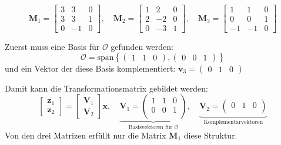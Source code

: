 \documentclass{article}
\begin{document}
\begin{task}
\begin{enumerate}[i]
\[\mathbf{M}_{1}=\left[\begin{array}{ccc}{3} & {3} & {0} \\ {3} & {3} & {1} \\ {0} & {-1} & {0}\end{array}\right], \quad \mathbf{M}_{2}=\left[\begin{array}{ccc}{1} & {2} & {0} \\ {2} & {-2} & {0} \\ {0} & {-3} & {1}\end{array}\right], \quad \mathbf{M}_{3}=\left[\begin{array}{ccc}{1} & {1} & {0} \\ {0} & {0} & {1} \\ {-1} & {-1} & {0}\end{array}\right]
 \]
 \begin{solution}
 Zuerst muss eine Basis für $\mathcal{O}$ gefunden werden:
 \[ \mathcal{O} = \text{span}\left\{ 
 \begin{pmatrix} 1 & 1 & 0 \end{pmatrix},
 \begin{pmatrix} 0 & 0 & 1 \end{pmatrix}
 \right\} \]
 und ein Vektor der diese Basis komplementiert: $\mathbf{v}_3 = \begin{pmatrix} 0 & 1 & 0 \end{pmatrix}$
 
 
 Damit kann die Transformationsmatrix gebildet werden:
 \[ 
\left[\begin{array}{l}{\mathbf{z}_{1}} \\ {\mathbf{z}_{2}}\end{array}\right]=\left[\begin{array}{c}{\mathbf{V}_{1}} \\ {\mathbf{V}_{2}}\end{array}\right] \mathbf{x}, \quad 
\underbrace{
\mathbf{V}_{1} = 
\begin{pmatrix}
1&1&0\\
0&0&1\\
\end{pmatrix}}_{\text{Basisvektoren für }\mathcal{O}}, \quad
\underbrace{
\mathbf{V}_{2} = 
\begin{pmatrix}
0&1&0\\
\end{pmatrix}}_{\text{Komplementärvektoren}}
 \]
 Von den drei Matrizen erfüllt nur die Matrix $\mathbf{M}_1$ diese Struktur.
 

\end{solution}
\end{enumerate}
\end{task}
\end{document}
